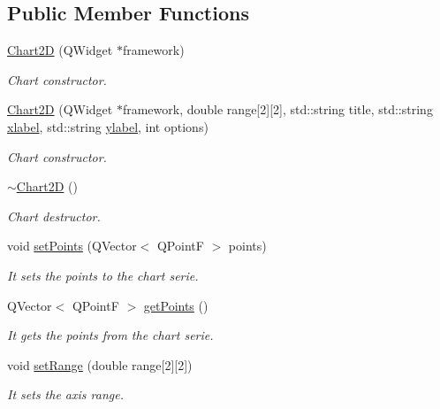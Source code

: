 \subsection*{Public Member Functions}
\begin{DoxyCompactItemize}
\item 
\hyperlink{class_chart2_d_a6883ce065d3a6a52f6f72efdf35d62aa}{Chart2D} (Q\+Widget $\ast$framework)
\begin{DoxyCompactList}\small\item\em Chart constructor. \end{DoxyCompactList}\item 
\hyperlink{class_chart2_d_a4d29e59bc8eafa3267c62034b51725b4}{Chart2D} (Q\+Widget $\ast$framework, double range\mbox{[}2\mbox{]}\mbox{[}2\mbox{]}, std\+::string title, std\+::string \hyperlink{class_chart2_d_af463dc0d42e747ab4a208a44db003bd7}{xlabel}, std\+::string \hyperlink{class_chart2_d_afc4139568c9a63b3bcdc4eeefc0dd2e8}{ylabel}, int options)
\begin{DoxyCompactList}\small\item\em Chart constructor. \end{DoxyCompactList}\item 
\mbox{\label{class_chart2_d_a73cac8978d3dd8a236ee4b2eae895a1e}} 
\hyperlink{class_chart2_d_a73cac8978d3dd8a236ee4b2eae895a1e}{$\sim$\+Chart2D} ()
\begin{DoxyCompactList}\small\item\em Chart destructor. \end{DoxyCompactList}\item 
void \hyperlink{class_chart2_d_a90db5078374163beef86536a33bbe8ba}{set\+Points} (Q\+Vector$<$ Q\+PointF $>$ points)
\begin{DoxyCompactList}\small\item\em It sets the points to the chart serie. \end{DoxyCompactList}\item 
Q\+Vector$<$ Q\+PointF $>$ \hyperlink{class_chart2_d_acbc12395c5a24b7146b8262ec2dab315}{get\+Points} ()
\begin{DoxyCompactList}\small\item\em It gets the points from the chart serie. \end{DoxyCompactList}\item 
void \hyperlink{class_chart2_d_acc60a5df11a3bb47c7888e108cd50f05}{set\+Range} (double range\mbox{[}2\mbox{]}\mbox{[}2\mbox{]})
\begin{DoxyCompactList}\small\item\em It sets the axis range. \end{DoxyCompactList}\item 

\end{DoxyCompactItemize}
